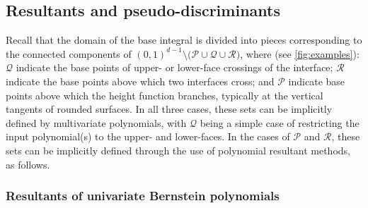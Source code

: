 \documentclass[onefignum,onetabnum,onealgnum,oneeqnum]{siamart190516}
\begin{document}
\subsection{Resultants and pseudo-discriminants}
\label{sec:resultants}


Recall that the domain of the base integral is divided into pieces corresponding to the connected components of $(0,1)^{d-1} \setminus \bigl(\mathcal P \cup \mathcal Q \cup \mathcal  R\bigr)$, where (see \cref{fig:examples}): $\mathcal Q$ indicate the base points of upper- or lower-face crossings of the interface; $\mathcal R$ indicate the base points above which two interfaces cross; and $\mathcal P$ indicate base points above which the height function branches, typically at the vertical tangents of rounded surfaces. In all three cases, these sets can be implicitly defined by multivariate polynomials, with $\mathcal Q$ being a simple case of restricting the input polynomial(s) to the upper- and lower-faces. In the cases of $\mathcal P$ and $\mathcal R$, these sets can be implicitly defined through the use of polynomial resultant methods, as follows.

\subsubsection{Resultants of univariate Bernstein polynomials} 
\end{document}
